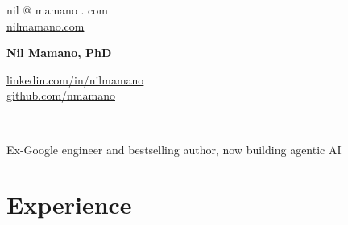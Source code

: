 \documentclass[letterpaper,10pt,oneside]{article}
\begin{document}
{\raggedleft

\begin{minipage}[c]{0.24\textwidth}
	\begin{flushleft}
nil @ mamano . com\\
	\href{http://www.nilmamano.com}{nilmamano.com}
	\end{flushleft}
\end{minipage}\hfill
\begin{minipage}[c]{0.4\textwidth}
	\begin{center}
		\Huge{\textbf{Nil Mamano, PhD}}
	\end{center}
\end{minipage}\hfill
\begin{minipage}[c]{0.24\textwidth}
	\begin{flushright}
	\href{http://www.linkedin.com/in/nilmamano}{linkedin.com/in/nilmamano}\\
	\href{http://www.github.com/nmamano}{github.com/nmamano}
	\end{flushright}
\end{minipage}\\
\vspace{9px}
{\centering\large Ex-Google engineer and bestselling author, now building agentic AI\par}
\vspace{0px}
\hrulefill
}


\section*{Experience}
\end{document}

